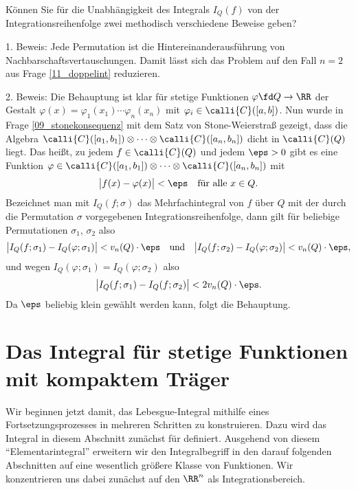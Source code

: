 \begin{frage}\label{11_unabreihe}\label{11_integrationsreihenfolge}
  Können Sie für die Unabhängigkeit des Integrals $I_Q(f)$ 
  von der Integrationsreihenfolge zwei methodisch verschiedene 
  Beweise geben?
\end{frage}

\begin{antwort}
  1. Beweis: Jede Permutation ist die Hintereinanderausführung 
  von Nachbarschaftsvertauschungen. Damit lässt sich das Problem auf den 
  Fall $n=2$ aus Frage \ref{11_doppelint} reduzieren. 

  2. Beweis: Die Behauptung ist klar für 
  stetige Funktionen $\varphi\fd Q\to\RR$ der 
  Gestalt $\varphi(x)=\varphi_1(x_1)\cdots \varphi_n(x_n)$ 
  mit $\varphi_i \in \calli{C}( [a,b] )$. Nun wurde in Frage 
  \ref{09_stonekonsequenz} mit dem Satz von Stone-Weierstraß gezeigt, dass 
  die Algebra $\calli{C}([a_1,b_1])\otimes \cdots \otimes \calli{C}([a_n,b_n])$ 
  dicht in $\calli{C}(Q)$ liegt. Das heißt, zu jedem $f\in \calli{C}(Q)$ 
  und jedem $\eps>0$ gibt es eine Funktion $\varphi \in \calli{C}([a_1,b_1])
  \otimes \cdots \otimes \calli{C}([a_n,b_n])$ mit 
  \[
  \big| f(x) - \varphi(x) \big| < \eps \quad\text{für alle $x\in Q$.}
  \]
  Bezeichnet man mit $I_{Q}(f;\sigma)$ das Mehrfachintegral von $f$ über 
  $Q$ mit der durch die Permutation $\sigma$ vorgegebenen 
  Integrationsreihenfolge, dann gilt für 
  beliebige Permutationen $\sigma_1$, $\sigma_2$ also 
  \[
  \big| I_{Q}(f;\sigma_1) - I_Q(\varphi;\sigma_1) \big| < v_n(Q) \cdot \eps 
  \quad\text{und}\quad 
  \big| I_{Q}(f;\sigma_2) - I_Q(\varphi;\sigma_2) \big| < v_n(Q) \cdot\eps,
  \]
  und wegen $I_Q(\varphi;\sigma_1) = I_Q(\varphi;\sigma_2)$ also 
  \[
  \big| I_{Q}(f;\sigma_1) - I_Q(f;\sigma_2) \big| < 2
  v_n(Q)\cdot\eps.
  \]
  Da $\eps$ beliebig klein gewählt werden kann, folgt die Behauptung.
  \AntEnd
\end{antwort}


\section{Das Integral f\"ur stetige Funktionen mit kompaktem Tr\"ager}

Wir beginnen jetzt damit, das Lebesgue-Integral mithilfe eines 
Fortsetzungsprozesses in mehreren Schritten zu konstruieren. Dazu wird 
das Integral in diesem Abschnitt zunächst für 
 definiert. Ausgehend 
von diesem 
"`Elementarintegral"' 
erweitern wir den Integralbegriff in den darauf folgenden Abschnitten 
auf eine wesentlich größere Klasse von Funktionen. 
Wir konzentrieren uns dabei zunächst auf den $\RR^n$ als Integrationsbereich. 

